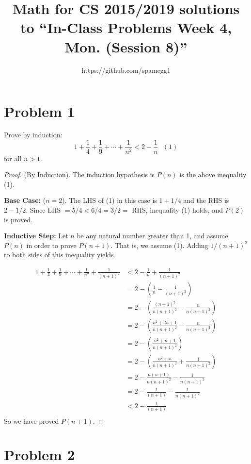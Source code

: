 \documentclass[14pt]{extarticle}
\title{Math for CS 2015/2019 solutions to ``In-Class Problems Week 4, Mon. (Session 8)''}
\author{https://github.com/spamegg1}
\begin{document}
\maketitle
\tableofcontents

\section{Problem 1}
Prove by induction:
$$
1 + \frac{1}{4} + \frac{1}{9} + \cdots + \frac{1}{n^2} < 2 - \frac{1}{n} \,\,\,\,(1)
$$
for all $n > 1$.
\begin{proof}
(By Induction). The induction hypothesis is $P(n)$ is the above inequality (1).

{\bf Base Case:} ($n = 2$). The LHS of (1) in this case is $1 + 1/4$ and the RHS is $2 - 1/2$. Since LHS $= 5/4 < 6/4 = 3/2 =$ RHS, inequality (1) holds, and $P(2)$ is proved.

{\bf Inductive Step:} Let $n$ be any natural number greater than 1, and assume $P(n)$ in order to prove $P(n + 1)$. That is, we assume (1). Adding $1/(n + 1)^2$ to both sides of this inequality yields

\begin{align*}
1 + \frac{1}{4} + \frac{1}{9} + \cdots + \frac{1}{n^2} + \frac{1}{(n+1)^2} & < 2 - \frac{1}{n} + \frac{1}{(n+1)^2}\\
& = 2 - \left(\frac{1}{n} - \frac{1}{(n+1)^2}\right)\\
& = 2 - \left(\frac{(n+1)^2}{n(n+1)^2} - \frac{n}{n(n+1)^2}\right)\\
& = 2 - \left(\frac{n^2+2n+1}{n(n+1)^2} - \frac{n}{n(n+1)^2}\right)\\
& = 2 - \left(\frac{n^2+n+1}{n(n+1)^2}\right)\\
& = 2 - \left(\frac{n^2+n}{n(n+1)^2} + \frac{1}{n(n+1)^2}\right)\\
& = 2 - \frac{n(n+1)}{n(n+1)^2} - \frac{1}{n(n+1)^2}\\
& = 2 - \frac{1}{(n+1)} - \frac{1}{n(n+1)^2}\\
& < 2 - \frac{1}{(n+1)} \\
\end{align*}
So we have proved $P(n+1)$.
\end{proof}

\section{Problem 2}
\end{document}
